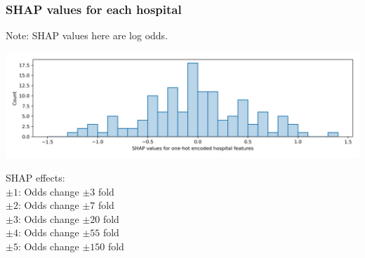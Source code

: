 \begin{frame}
\frametitle{SHAP values for each hospital}
Note: SHAP values here are log odds. 
\begin{center}
\includegraphics[width=1.0\textwidth]{./images/03d_xgb_10_features_hosp_shap_hist.jpg}
\end{center}
\scriptsize
SHAP effects: \\
$\pm1$: Odds change $\pm3$ fold\\
$\pm2$: Odds change $\pm7$ fold\\
$\pm3$: Odds change $\pm20$ fold\\
$\pm4$: Odds change $\pm55$ fold\\
$\pm5$: Odds change $\pm150$ fold
\end{frame}